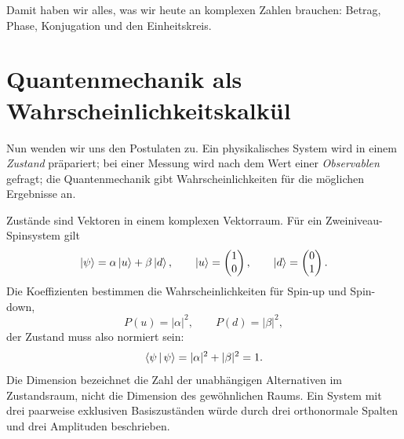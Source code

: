 \begin{classroomqa}
\end{classroomqa}

Damit haben wir alles, was wir heute an komplexen Zahlen brauchen: Betrag, Phase, Konjugation und den Einheitskreis.

\section{Quantenmechanik als Wahrscheinlichkeitskalkül}

Nun wenden wir uns den Postulaten zu. Ein physikalisches System wird in einem \emph{Zustand} präpariert; bei einer Messung wird nach dem Wert einer \emph{Observablen} gefragt; die Quantenmechanik gibt Wahrscheinlichkeiten für die möglichen Ergebnisse an.

Zustände sind Vektoren in einem komplexen Vektorraum. Für ein Zweiniveau-Spinsystem gilt
\begin{equation}
  \left\lvert\psi\right\rangle=\alpha\left\lvert u\right\rangle+\beta\left\lvert d\right\rangle,
  \qquad
  \left\lvert u\right\rangle=\begin{pmatrix}1\\0\end{pmatrix},
  \qquad
  \left\lvert d\right\rangle=\begin{pmatrix}0\\1\end{pmatrix}.
  \label{eq:l03-two-level-state}
\end{equation}
Die Koeffizienten bestimmen die Wahrscheinlichkeiten für Spin-up und Spin-down,
\begin{equation}
  P(u)=|\alpha|^2,
  \qquad
  P(d)=|\beta|^2,
\end{equation}
der Zustand muss also normiert sein:
\begin{equation}
  \left\langle\psi\,\middle|\,\psi\right\rangle
  =|\alpha|^2+|\beta|^2
  =1.
  \label{eq:l03-state-normalization}
\end{equation}
Die Dimension bezeichnet die Zahl der unabhängigen Alternativen im Zustandsraum, nicht die Dimension des gewöhnlichen Raums. Ein System mit drei paarweise exklusiven Basiszuständen würde durch drei orthonormale Spalten und drei Amplituden beschrieben.

